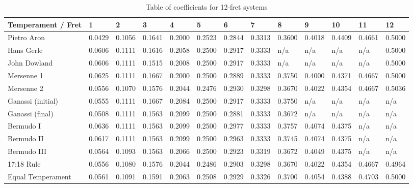 \begin{table}
\tiny
\begin{center}
\begin{tabular}{| l || l | l | l | l | l | l | l | l | l | l | l | l |}
\hline
\textbf{Temperament / Fret} & \textbf{1} & \textbf{2} & \textbf{3} & \textbf{4} & \textbf{5} & \textbf{6} & \textbf{7} & \textbf{8} & \textbf{9} & \textbf{10} & \textbf{11} & \textbf{12} \\
\hline
\hline
Pietro Aron & 0.0429 & 0.1056 & 0.1641 & 0.2000 & 0.2523 & 0.2844 & 0.3313 & 0.3600 & 0.4018 & 0.4409 & 0.4661 & 0.5000 \\
\hline
Hans Gerle & 0.0606 & 0.1111 & 0.1616 & 0.2058 & 0.2500 & 0.2917 & 0.3333 & n/a & n/a & n/a & n/a & 0.5000 \\
\hline
John Dowland & 0.0606 & 0.1111 & 0.1515 & 0.2008 & 0.2500 & 0.2917 & 0.3333 & n/a & n/a & n/a & n/a & 0.5000 \\
\hline
Mersenne 1 & 0.0625 & 0.1111 & 0.1667 & 0.2000 & 0.2500 & 0.2889 & 0.3333 & 0.3750 & 0.4000 & 0.4371 & 0.4667 & 0.5000 \\
\hline
Mersenne 2 & 0.0556 & 0.1070 & 0.1576 & 0.2044 & 0.2476 & 0.2930 & 0.3298 & 0.3670 & 0.4022 & 0.4354 & 0.4667 & 0.5036 \\
\hline
Ganassi (initial)  & 0.0555 & 0.1111 & 0.1667 & 0.2084 & 0.2500 & 0.2917 & 0.3333 & 0.3750 & n/a & n/a & n/a & n/a \\
\hline
Ganassi (final)  & 0.0508 & 0.1111 & 0.1563 & 0.2099 & 0.2500 & 0.2881 & 0.3333 & 0.3672 & n/a & n/a & n/a & n/a \\
\hline
Bermudo I & 0.0636 & 0.1111 & 0.1563 & 0.2099 & 0.2500 & 0.2977 & 0.3333 & 0.3757 & 0.4074 & 0.4375 & n/a & n/a \\
\hline
Bermudo II & 0.0617 & 0.1111 & 0.1563 & 0.2099 & 0.2500 & 0.2963 & 0.3333 & 0.3745 & 0.4074 & 0.4375 & n/a & n/a \\
\hline
Bermudo III & 0.0564 & 0.1093 & 0.1563 & 0.2066 & 0.2500 & 0.2923 & 0.3319 & 0.3672 & 0.4049 & 0.4375 & n/a & n/a \\
\hline
17:18 Rule & 0.0556 & 0.1080 & 0.1576 & 0.2044 & 0.2486 & 0.2903 & 0.3298 & 0.3670 & 0.4022 & 0.4354 & 0.4667 & 0.4964 \\
\hline
Equal Temperament & 0.0561 & 0.1091 & 0.1591 & 0.2063 & 0.2508 & 0.2929 & 0.3326 & 0.3700 & 0.4054 & 0.4388 & 0.4703 & 0.5000 \\
\hline
\end{tabular}
\end{center}
\normalsize
\caption{Table of coefficients for 12-fret systems}
\label{calc-12}
\end{table}